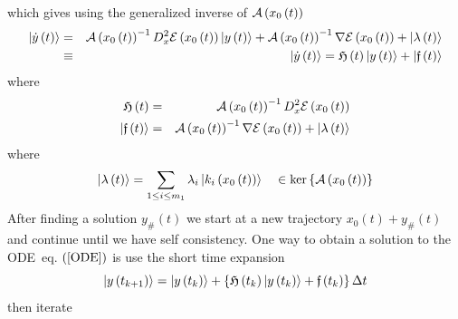 which gives using the generalized inverse of ${\cal A}\left( x_{0}\left(
t\right) \right) $ 
\begin{eqnarray}
\left| \dot{y}\left( t\right) \right\rangle &=&{\cal A}\left( x_{0}\left(
t\right) \right) ^{-1}D_{x}^{2}{\cal E}\left( x_{0}\left( t\right) \right)
\left| y\left( t\right) \right\rangle +{\cal A}\left( x_{0}\left( t\right)
\right) ^{-1}\nabla {\cal E}\left( x_{0}\left( t\right) \right) +\left|
\lambda \left( t\right) \right\rangle  \nonumber \\
&\equiv &\left| \dot{y}\left( t\right) \right\rangle ={\frak H}\left(
t\right) \left| y\left( t\right) \right\rangle +\left| {\frak f}\left(
t\right) \right\rangle  \label{ODE}
\end{eqnarray}%
where 
\begin{eqnarray}
{\frak H}\left( t\right) &=&{\cal A}\left( x_{0}\left( t\right) \right)
^{-1}D_{x}^{2}{\cal E}\left( x_{0}\left( t\right) \right)  \nonumber \\
\left| {\frak f}\left( t\right) \right\rangle &=&{\cal A}\left( x_{0}\left(
t\right) \right) ^{-1}\nabla {\cal E}\left( x_{0}\left( t\right) \right)
+\left| \lambda \left( t\right) \right\rangle
\end{eqnarray}%
where 
\begin{equation}
\left| \lambda \left( t\right) \right\rangle =\sum_{1\leq i\leq
m_{1}}\lambda _{i}\left| k_{i}\left( x_{0}\left( t\right) \right)
\right\rangle \quad \in \ker \left\{ {\cal A}\left( x_{0}\left( t\right)
\right) \right\}
\end{equation}%
After finding a solution $y_{\#}\left( t\right) $ we start at a new
trajectory $x_{0}\left( t\right) +y_{\#}\left( t\right) $ and continue until
we have self consistency. One way to obtain a solution to the ODE\ eq. $%
\left( \ref{ODE}\right) $ is use the short time expansion 
\begin{equation}
\left| y\left( t_{k+1}\right) \right\rangle =\left| y\left( t_{k}\right)
\right\rangle +\left\{ {\frak H}\left( t_{k}\right) \left| y\left(
t_{k}\right) \right\rangle +{\frak f}\left( t_{k}\right) \right\} \Delta t
\end{equation}%
then iterate 
